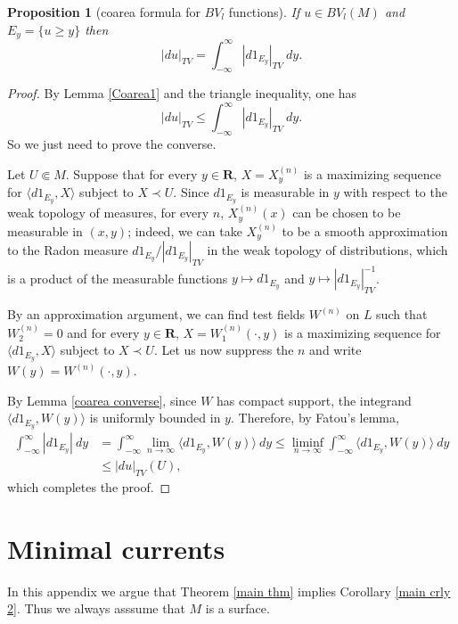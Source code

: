 \documentclass[reqno,12pt,letterpaper]{amsart}
\newcommand{\RR}{\mathbf{R}}
\newtheorem{proposition}[theorem]{Proposition}
\theoremstyle{definition}
\numberwithin{equation}{section}
\begin{document}
\begin{proposition}[coarea formula for $BV_l$ functions]\label{Coarea2}
If $u \in BV_l(M)$ and $E_y = \{u \geq y\}$ then
$$|du|_{TV} = \int_{-\infty}^\infty |d1_{E_y}|_{TV} ~dy.$$
\end{proposition}
\begin{proof}
By Lemma \ref{Coarea1} and the triangle inequality, one has
$$|du|_{TV} \leq \int_{-\infty}^\infty |d1_{E_y}|_{TV} ~dy.$$
So we just need to prove the converse.

Let $U \Subset M$.
Suppose that for every $y \in \RR$, $X = X^{(n)}_y$ is a maximizing sequence for $\langle d1_{E_y}, X\rangle$ subject to $X \prec U$.
Since $d 1_{E_y}$ is measurable in $y$ with respect to the weak topology of measures, for every $n$, $X^{(n)}_y(x)$ can be chosen to be measurable in $(x, y)$; indeed, we can take $X^{(n)}_y$ to be a smooth approximation to the Radon measure $d 1_{E_y}/|d 1_{E_y}|_{TV}$ in the weak topology of distributions, which is a product of the measurable functions $y \mapsto d 1_{E_y}$ and $y \mapsto |d 1_{E_y}|_{TV}^{-1}$.

By an approximation argument, we can find test fields $W^{(n)}$ on $L$ such that $W^{(n)}_2 = 0$ and for every $y \in \RR$, $X = W^{(n)}_1(\cdot, y)$ is a maximizing sequence for $\langle d 1_{E_y}, X\rangle$ subject to $X \prec U$.
Let us now suppress the $n$ and write $W(y) = W^{(n)}(\cdot, y)$.

By Lemma \ref{coarea converse}, since $W$ has compact support, the integrand $\langle d 1_{E_y}, W(y)\rangle$ is uniformly bounded in $y$.
Therefore, by Fatou's lemma,
\begin{align*}
\int_{-\infty}^\infty |d 1_{E_y}| ~dy &= \int_{-\infty}^\infty \lim_{n \to \infty} \langle d 1_{E_y}, W(y)\rangle ~dy \leq \liminf_{n \to \infty} \int_{-\infty}^\infty \langle d 1_{E_y}, W(y)\rangle ~dy \\
&\leq |d u|_{TV}(U),
\end{align*}
which completes the proof.
\end{proof}



\section{Minimal currents} \label{chains of geodesics}
In this appendix we argue that Theorem \ref{main thm} implies Corollary \ref{main crly 2}.
Thus we always asssume that $M$ is a surface.
\end{document}
